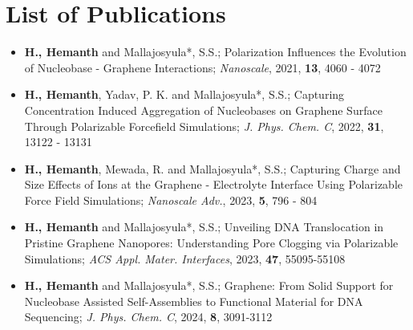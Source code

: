 \section{List of Publications}
\begin{itemize}
    \item \textbf{H., Hemanth} and Mallajosyula*, S.S.; Polarization Influences the Evolution of Nucleobase - Graphene Interactions; {\textit{Nanoscale}, 2021, \textbf{13}, 4060 - 4072}
    \item \textbf{H., Hemanth}, Yadav, P. K. and Mallajosyula*, S.S.; Capturing Concentration Induced Aggregation of Nucleobases on Graphene Surface Through Polarizable Forcefield Simulations; {\textit{J. Phys. Chem. C}, 2022, \textbf{31}, 13122 - 13131}
    \item \textbf{H., Hemanth}, Mewada, R. and Mallajosyula*, S.S.; Capturing Charge and Size Effects of Ions at the Graphene - Electrolyte Interface Using Polarizable Force Field Simulations; {\textit{Nanoscale Adv.}, 2023, \textbf{5}, 796 - 804}
    \item \textbf{H., Hemanth} and Mallajosyula*, S.S.; Unveiling DNA Translocation in Pristine Graphene Nanopores: Understanding Pore Clogging via Polarizable Simulations; {\textit{ACS Appl. Mater. Interfaces}, 2023, \textbf{47}, 55095-55108} 
    \item \textbf{H., Hemanth} and Mallajosyula*, S.S.; Graphene: From Solid Support for Nucleobase Assisted Self-Assemblies to Functional Material for DNA Sequencing; {\textit{J. Phys. Chem. C}, 2024, \textbf{8}, 3091-3112} 
\end{itemize}
